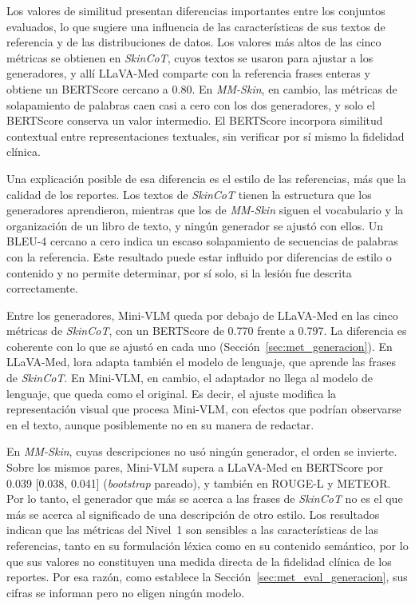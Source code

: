 Los valores de similitud presentan diferencias importantes entre los conjuntos evaluados, lo que sugiere una influencia de las características de sus textos de referencia y de las distribuciones de datos. Los valores más altos de las cinco métricas se obtienen en
\emph{SkinCoT}, cuyos textos se usaron para ajustar a los generadores, y allí LLaVA-Med comparte con la referencia
frases enteras y obtiene un BERTScore cercano a 0.80. En \emph{MM-Skin}, en cambio, las métricas de solapamiento de
palabras caen casi a cero con los dos generadores, y solo el BERTScore conserva un valor intermedio. El BERTScore incorpora similitud contextual entre representaciones textuales, sin verificar por sí mismo la fidelidad clínica.

Una explicación posible de esa diferencia es el estilo de las referencias, más que la calidad de los reportes. Los
textos de \emph{SkinCoT} tienen la estructura que los generadores aprendieron, mientras que los de \emph{MM-Skin}
siguen el vocabulario y la organización de un libro de texto, y ningún generador se ajustó con ellos. Un BLEU-4 cercano a cero indica un escaso solapamiento de secuencias de palabras con la referencia. Este resultado puede estar influido por diferencias de estilo o contenido y no permite determinar, por sí solo, si la lesión fue descrita correctamente.

Entre los generadores, Mini-VLM queda por debajo de LLaVA-Med en las cinco métricas de \emph{SkinCoT}, con un
BERTScore de 0.770 frente a 0.797. La diferencia es coherente con lo que se ajustó en cada uno
(Sección~\ref{sec:met_generacion}). En LLaVA-Med, \gls{lora} adapta también el modelo de lenguaje, que aprende las
frases de \emph{SkinCoT}. En Mini-VLM, en cambio, el adaptador no llega al modelo de lenguaje, que queda como el
original. Es decir, el ajuste modifica la representación visual que procesa Mini-VLM, con efectos que podrían observarse en el texto, aunque posiblemente no en su manera de redactar.

En \emph{MM-Skin}, cuyas descripciones no usó ningún generador, el orden se invierte. Sobre los mismos pares,
Mini-VLM supera a LLaVA-Med en BERTScore por 0.039 [0.038, 0.041] (\emph{bootstrap} pareado), y también en ROUGE-L y
METEOR. Por lo tanto, el generador que más se acerca a las frases de \emph{SkinCoT} no es el que más se acerca al
significado de una descripción de otro estilo. Los resultados indican que las métricas del Nivel~1 son sensibles a las características de las referencias, tanto en su formulación léxica como en su contenido semántico, por lo que sus valores no constituyen una medida directa de la fidelidad clínica de los reportes. Por esa razón, como establece la Sección~\ref{sec:met_eval_generacion}, sus cifras se informan pero
no eligen ningún modelo.

